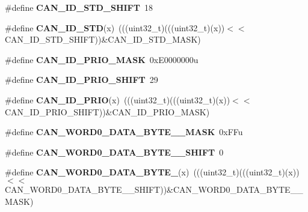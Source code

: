 \begin{DoxyCompactItemize}
\item 
\#define {\bfseries C\+A\+N\+\_\+\+I\+D\+\_\+\+S\+T\+D\+\_\+\+S\+H\+I\+FT}~18\hypertarget{group__CAN__Register__Masks_gae8834f24b0aac84530ffd22f683ef5b4}{}\label{group__CAN__Register__Masks_gae8834f24b0aac84530ffd22f683ef5b4}

\item 
\#define {\bfseries C\+A\+N\+\_\+\+I\+D\+\_\+\+S\+TD}(x)~(((uint32\+\_\+t)(((uint32\+\_\+t)(x))$<$$<$C\+A\+N\+\_\+\+I\+D\+\_\+\+S\+T\+D\+\_\+\+S\+H\+I\+FT))\&C\+A\+N\+\_\+\+I\+D\+\_\+\+S\+T\+D\+\_\+\+M\+A\+SK)\hypertarget{group__CAN__Register__Masks_ga67395c1778e9a7ba45f490a9b13db60b}{}\label{group__CAN__Register__Masks_ga67395c1778e9a7ba45f490a9b13db60b}

\item 
\#define {\bfseries C\+A\+N\+\_\+\+I\+D\+\_\+\+P\+R\+I\+O\+\_\+\+M\+A\+SK}~0x\+E0000000u\hypertarget{group__CAN__Register__Masks_gac1e36313ed3d0d09eec97537d3bda962}{}\label{group__CAN__Register__Masks_gac1e36313ed3d0d09eec97537d3bda962}

\item 
\#define {\bfseries C\+A\+N\+\_\+\+I\+D\+\_\+\+P\+R\+I\+O\+\_\+\+S\+H\+I\+FT}~29\hypertarget{group__CAN__Register__Masks_ga7bd5cd878ee64f1b60ff983442ae7aa9}{}\label{group__CAN__Register__Masks_ga7bd5cd878ee64f1b60ff983442ae7aa9}

\item 
\#define {\bfseries C\+A\+N\+\_\+\+I\+D\+\_\+\+P\+R\+IO}(x)~(((uint32\+\_\+t)(((uint32\+\_\+t)(x))$<$$<$C\+A\+N\+\_\+\+I\+D\+\_\+\+P\+R\+I\+O\+\_\+\+S\+H\+I\+FT))\&C\+A\+N\+\_\+\+I\+D\+\_\+\+P\+R\+I\+O\+\_\+\+M\+A\+SK)\hypertarget{group__CAN__Register__Masks_gaeaa0dd64fdad35cb7c9565117e6f7a95}{}\label{group__CAN__Register__Masks_gaeaa0dd64fdad35cb7c9565117e6f7a95}

\item 
\#define {\bfseries C\+A\+N\+\_\+\+W\+O\+R\+D0\+\_\+\+D\+A\+T\+A\+\_\+\+B\+Y\+T\+E\+\_\+\_\+\+M\+A\+SK}~0x\+F\+Fu\hypertarget{group__CAN__Register__Masks_ga2b8efb33402c5777d3d7b40c0c84eaac}{}\label{group__CAN__Register__Masks_ga2b8efb33402c5777d3d7b40c0c84eaac}

\item 
\#define {\bfseries C\+A\+N\+\_\+\+W\+O\+R\+D0\+\_\+\+D\+A\+T\+A\+\_\+\+B\+Y\+T\+E\+\_\+\_\+\+S\+H\+I\+FT}~0\hypertarget{group__CAN__Register__Masks_ga3835334fa3df07e17141619f9bdb33df}{}\label{group__CAN__Register__Masks_ga3835334fa3df07e17141619f9bdb33df}

\item 
\#define {\bfseries C\+A\+N\+\_\+\+W\+O\+R\+D0\+\_\+\+D\+A\+T\+A\+\_\+\+B\+Y\+T\+E\+\_}(x)~(((uint32\+\_\+t)(((uint32\+\_\+t)(x))$<$$<$C\+A\+N\+\_\+\+W\+O\+R\+D0\+\_\+\+D\+A\+T\+A\+\_\+\+B\+Y\+T\+E\+\_\+\_\+\+S\+H\+I\+FT))\&C\+A\+N\+\_\+\+W\+O\+R\+D0\+\_\+\+D\+A\+T\+A\+\_\+\+B\+Y\+T\+E\+\_\+\_\+\+M\+A\+SK)\hypertarget{group__CAN__Register__Masks_ga6003475760ed870fa3edaa34a75f2170}{}\label{group__CAN__Register__Masks_ga6003475760ed870fa3edaa34a75f2170}


\end{DoxyCompactItemize}
